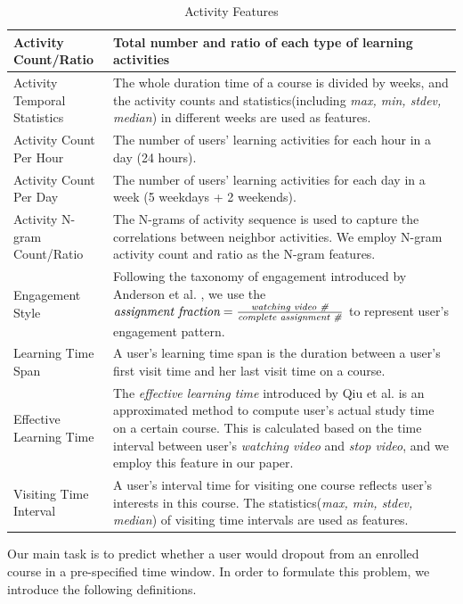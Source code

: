 \begin{table}[]
	\caption{Activity Features}
	\centering
	\begin{tabular}{p{3.7cm}|p{13.4cm}}
		\hline
		Activity Count/Ratio  &  Total number and ratio of each type of learning activities\\ \hline
		Activity Temporal Statistics&  The whole duration time of a course is divided by weeks, and the activity counts and statistics(including \emph{max, min, stdev, median}) in different weeks are used as features.\\ \hline
		Activity Count Per Hour  &  The number of users' learning activities for each hour in a day (24 hours).\\ \hline
		Activity Count Per Day & The number of users' learning activities for each day in a week (5 weekdays + 2 weekends). \\ \hline
		Activity N-gram Count/Ratio & The N-grams of activity sequence is used to capture the correlations between neighbor activities. We employ N-gram activity count and ratio as the N-gram features. \\ 
	 \hline
		Engagement Style & Following the taxonomy of engagement introduced by Anderson et al. \cite{Anderson:2014:EMO:2566486.2568042ß}, we use the $\emph{assignment fraction} = \frac{ \emph{watching video \#}}{ \emph{complete assignment \#}}$ to represent user's engagement pattern.  \\ \hline
		Learning Time Span & A user's learning time span is the duration between a user's first visit time and her last visit time on a course.  \\ \hline
		Effective Learning Time & The \emph{effective learning time} introduced by Qiu et al. \cite{Qiu:2016:MPL:2835776.2835842} is an approximated method to compute user's actual study time on a certain course. This is calculated based on the time interval between user's \emph{watching video} and \emph{stop video}, and we employ this feature in our paper.\\ \hline
		Visiting Time Interval & A user's interval time for visiting one course reflects user's interests in this course. The statistics(\emph{max, min, stdev, median}) of visiting time intervals are used as features.
		\\ \hline
	\end{tabular}
	\label{tab:acvtityFeat}
\end{table}

Our main task is to predict whether a user would dropout from an enrolled course in a pre-specified time window. In order to formulate this problem, we introduce the following definitions. \\


